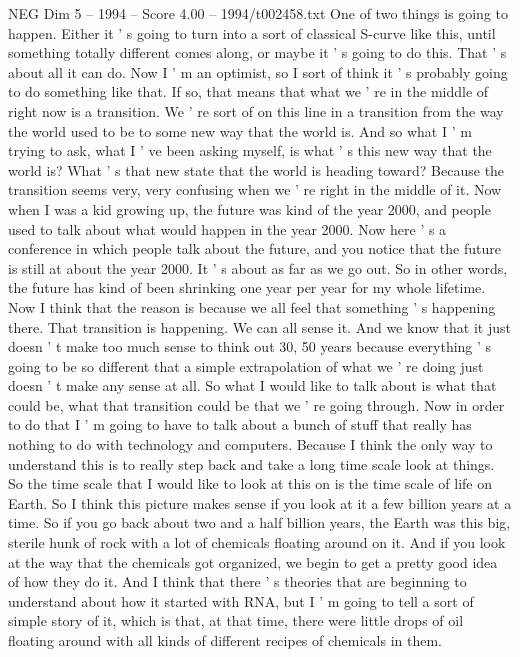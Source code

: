 \begin{textsample}{NEG Dim 5 – 1994 – Score 4.00 – 1994/t002458.txt}
One of two things is going to happen.
Either it ' s going to turn into a sort of classical S-curve like this, until something totally different comes along, or maybe it ' s going to do this.
That ' s about all it can do.
Now I ' m an optimist, so I sort of think it ' s probably going to do something like that.
If so, that means that what we ' re in the middle of right now is a transition.
We ' re sort of on this line in a transition from the way the world used to be to some new way that the world is.
And so what I ' m trying to ask, what I ' ve been asking myself, is what ' s this new way that the world is?
What ' s that new state that the world is heading toward?
Because the transition seems very, very confusing when we ' re right in the middle of it.
Now when I was a kid growing up, the future was kind of the year 2000, and people used to talk about what would happen in the year 2000.
Now here ' s a conference in which people talk about the future, and you notice that the future is still at about the year 2000.
It ' s about as far as we go out.
So in other words, the future has kind of been shrinking one year per year for my whole lifetime.
Now I think that the reason is because we all feel that something ' s happening there.
That transition is happening.
We can all sense it.
And we know that it just doesn ' t make too much sense to think out 30, 50 years because everything ' s going to be so different that a simple extrapolation of what we ' re doing just doesn ' t make any sense at all.
So what I would like to talk about is what that could be, what that transition could be that we ' re going through.
Now in order to do that I ' m going to have to talk about a bunch of stuff that really has nothing to do with technology and computers.
Because I think the only way to understand this is to really step back and take a long time scale look at things.
So the time scale that I would like to look at this on is the time scale of life on Earth.
So I think this picture makes sense if you look at it a few billion years at a time.
So if you go back about two and a half billion years, the Earth was this big, sterile hunk of rock with a lot of chemicals floating around on it.
And if you look at the way that the chemicals got organized, we begin to get a pretty good idea of how they do it.
And I think that there ' s theories that are beginning to understand about how it started with RNA, but I ' m going to tell a sort of simple story of it, which is that, at that time, there were little drops of oil floating around with all kinds of different recipes of chemicals in them.

\end{textsample}
